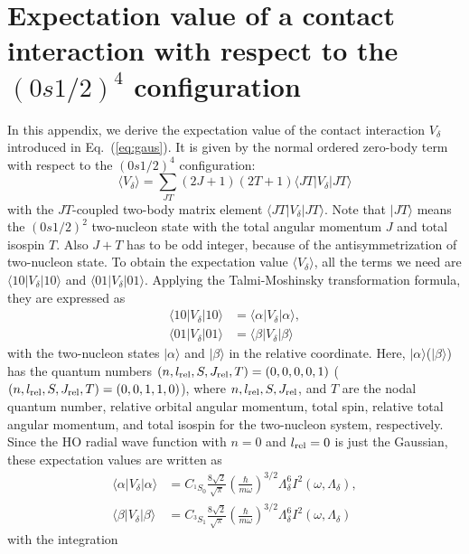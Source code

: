 \documentclass[aps,prc, dvips, twocolumn,groupedaddress,showkeys,showpacs,floatfix,superscriptaddress]{revtex4-1}
\newcommand{\<}{\langle}
\renewcommand{\>}{\rangle}
\begin{document}
\section{Expectation value of a contact interaction with respect to
the $(0s1/2)^{4}$ configuration \label{sec:toymodel}}
In this appendix, we derive the expectation value of the contact interaction $V_{\delta}$ introduced in Eq.~(\ref{eq:gaus}).
It is given by the normal ordered zero-body term with respect to the $(0s1/2)^{4}$ configuration:
\begin{equation}
  \<V_{\delta}\> = \sum_{JT} (2J+1) (2T+1) \<JT|V_{\delta}|JT\>
\end{equation}
with the $JT$-coupled two-body matrix element $\<JT|V_{\delta}|JT\>$.
Note that $|JT\>$ means the $(0s1/2)^{2}$ two-nucleon state with the total angular momentum $J$ and
 total isospin $T$.
Also $J + T$ has to be odd integer, because of the antisymmetrization of two-nucleon state.
To obtain the expectation value $\<V_{\delta}\>$,
all the terms we need are $\<10|V_{\delta}|10\>$ and $\<01|V_{\delta}|01\>$.
Applying the Talmi-Moshinsky transformation formula, they are expressed as
\begin{align}
  \<10|V_{\delta}|10\> &= \<\alpha|V_{\delta}|\alpha \>, \\
  \<01|V_{\delta}|01\> &= \<\beta| V_{\delta}|\beta \>
\end{align}
with the two-nucleon states $|\alpha\>$ and $|\beta\>$ in the relative coordinate.
Here, $|\alpha\>$($|\beta\>$) has the quantum numbers $(n, l_{\rm rel}, S, J_{\rm rel}, T) = (0, 0, 0, 0, 1)$
($(n, l_{\rm rel}, S, J_{\rm rel}, T) = (0, 0, 1, 1, 0)$),
where $n, l_{\rm rel}, S, J_{\rm rel}$, and $T$ are the nodal quantum number,
 relative orbital angular momentum, total spin, relative total angular momentum, and
 total isospin for the two-nucleon system, respectively.
 Since the HO radial wave function with $n = 0$ and $l_{\rm rel} = 0$ is just the Gaussian,
 these expectation values are written as
 \begin{align}
   \label{eq:rel1s0}
   \<\alpha|V_{\delta}|\alpha\> &= C_{^{1}S_{0}}\frac{8\sqrt{2}}{\sqrt{\pi}}
   \left( \frac{\hbar}{m\omega} \right)^{3/2} \Lambda_{\delta}^{6}
   I^{2}(\omega, \Lambda_{\delta}), \\
   \label{eq:rel3s1}
   \<\beta|V_{\delta}|\beta\> &= C_{^{3}S_{1}}\frac{8\sqrt{2}}{\sqrt{\pi}}
   \left( \frac{\hbar}{m\omega} \right)^{3/2} \Lambda_{\delta}^{6}
   I^{2}(\omega, \Lambda_{\delta})
 \end{align}
 with the integration
\end{document}
